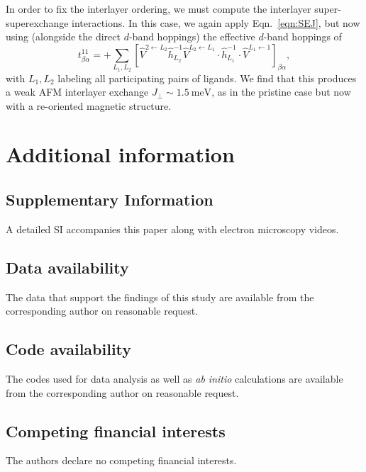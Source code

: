 \documentclass[aps,prl,showpacs,twocolumn,superscriptaddress,floatfix]{revtex4-2}
\begin{document}
In order to fix the interlayer ordering, we must compute the interlayer super-superexchange interactions.
In this case, we again apply Eqn.~\ref{eqn:SEJ}, but now using (alongside the direct $d$-band hoppings) the effective $d$-band hoppings of 
\begin{equation}
    t^{11}_{\beta \alpha} = + \sum_{L_1,L_2} \left[ \hat{V}^{2\leftarrow L_2}\hat{h}_{L_2}^{-1}\hat{V}^{L_2\leftarrow L_1}\cdot \hat{h}_{L_1}^{-1} \cdot \hat{V}^{L_1\leftarrow 1}  \right]_{\beta\alpha},
\end{equation}
with $L_1,L_2$ labeling all participating pairs of ligands. 
We find that this produces a weak AFM interlayer exchange $J_{\perp} \sim \SI{1.5}{\meV}$, as in the pristine case but now with a re-oriented magnetic structure. 

\section{Additional information}

\subsection{Supplementary Information} A detailed SI accompanies this paper along with electron microscopy videos.

\subsection{Data availability} The data that support the findings of this study are available from the corresponding author on reasonable request.

\subsection{Code availability} The codes used for data analysis as well as \emph{ab initio} calculations are available from the corresponding author on reasonable request.

\subsection{Competing financial interests} The authors declare no competing financial interests.


%
%


\end{document}
